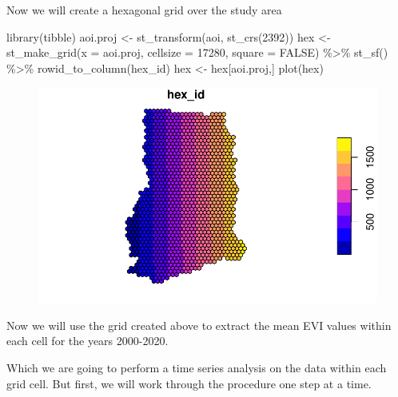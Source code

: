 \documentclass[
  letterpaper,
  DIV=11,
  numbers=noendperiod]{scrartcl}
\newenvironment{Shaded}{\begin{snugshade}}{\end{snugshade}}
\newcommand{\AttributeTok}[1]{\textcolor[rgb]{0.40,0.45,0.13}{#1}}
\newcommand{\ConstantTok}[1]{\textcolor[rgb]{0.56,0.35,0.01}{#1}}
\newcommand{\DecValTok}[1]{\textcolor[rgb]{0.68,0.00,0.00}{#1}}
\newcommand{\FunctionTok}[1]{\textcolor[rgb]{0.28,0.35,0.67}{#1}}
\newcommand{\NormalTok}[1]{\textcolor[rgb]{0.00,0.23,0.31}{#1}}
\newcommand{\OtherTok}[1]{\textcolor[rgb]{0.00,0.23,0.31}{#1}}
\newcommand{\SpecialCharTok}[1]{\textcolor[rgb]{0.37,0.37,0.37}{#1}}
\newcommand{\StringTok}[1]{\textcolor[rgb]{0.13,0.47,0.30}{#1}}
\begin{document}
Now we will create a hexagonal grid over the study area

\begin{Shaded}
\begin{Highlighting}[]
\FunctionTok{library}\NormalTok{(tibble)}
\NormalTok{aoi.proj }\OtherTok{\textless{}{-}} \FunctionTok{st\_transform}\NormalTok{(aoi, }\FunctionTok{st\_crs}\NormalTok{(}\DecValTok{2392}\NormalTok{))}
\NormalTok{hex }\OtherTok{\textless{}{-}} \FunctionTok{st\_make\_grid}\NormalTok{(}\AttributeTok{x =}\NormalTok{ aoi.proj, }\AttributeTok{cellsize =} \DecValTok{17280}\NormalTok{, }\AttributeTok{square =} \ConstantTok{FALSE}\NormalTok{) }\SpecialCharTok{\%\textgreater{}\%}
\FunctionTok{st\_sf}\NormalTok{() }\SpecialCharTok{\%\textgreater{}\%}
\FunctionTok{rowid\_to\_column}\NormalTok{(}\StringTok{\textquotesingle{}hex\_id\textquotesingle{}}\NormalTok{)}
\NormalTok{hex }\OtherTok{\textless{}{-}}\NormalTok{ hex[aoi.proj,]}
\FunctionTok{plot}\NormalTok{(hex)}
\end{Highlighting}
\end{Shaded}

\begin{figure}[H]

{\centering \includegraphics{Quarto_files/figure-pdf/unnamed-chunk-5-1.pdf}

}

\end{figure}

Now we will use the grid created above to extract the mean EVI values
within each cell for the years 2000-2020.

Which we are going to perform a time series analysis on the data within
each grid cell. But first, we will work through the procedure one step
at a time.
\end{document}
